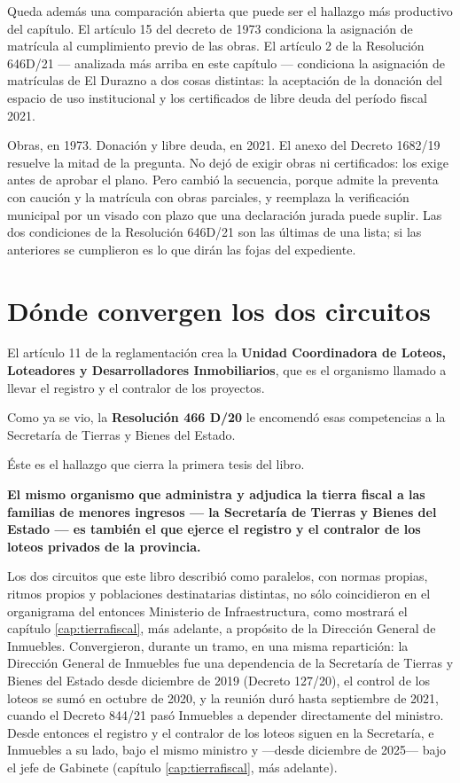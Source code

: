 Queda además una comparación abierta que puede ser el hallazgo más productivo del capítulo. El artículo 15 del decreto de 1973 condiciona la asignación de matrícula al cumplimiento previo de las obras. El artículo 2 de la Resolución 646D/21 --- analizada más arriba en este capítulo --- condiciona la asignación de matrículas de El Durazno a dos cosas distintas: la aceptación de la donación del espacio de uso institucional y los certificados de libre deuda del período fiscal 2021.

Obras, en 1973. Donación y libre deuda, en 2021. El anexo del Decreto 1682/19 resuelve la mitad de la pregunta. No dejó de exigir obras ni certificados: los exige antes de aprobar el plano. Pero cambió la secuencia, porque admite la preventa con caución y la matrícula con obras parciales, y reemplaza la verificación municipal por un visado con plazo que una declaración jurada puede suplir. Las dos condiciones de la Resolución 646D/21 son las últimas de una lista; si las anteriores se cumplieron es lo que dirán las fojas del expediente.

\section{Dónde convergen los dos circuitos}

El artículo 11 de la reglamentación crea la \textbf{Unidad Coordinadora de Loteos, Loteadores y Desarrolladores Inmobiliarios}, que es el organismo llamado a llevar el registro y el contralor de los proyectos.

Como ya se vio, la \textbf{Resolución 466 D/20} le encomendó esas competencias a la Secretaría de Tierras y Bienes del Estado.

Éste es el hallazgo que cierra la primera tesis del libro.

\textbf{El mismo organismo que administra y adjudica la tierra fiscal a las familias de menores ingresos --- la Secretaría de Tierras y Bienes del Estado --- es también el que ejerce el registro y el contralor de los loteos privados de la provincia.}

Los dos circuitos que este libro describió como paralelos, con normas propias, ritmos propios y poblaciones destinatarias distintas, no sólo coincidieron en el organigrama del entonces Ministerio de Infraestructura, como mostrará el capítulo \ref{cap:tierrafiscal}, más adelante, a propósito de la Dirección General de Inmuebles. Convergieron, durante un tramo, en una misma repartición: la Dirección General de Inmuebles fue una dependencia de la Secretaría de Tierras y Bienes del Estado desde diciembre de 2019 (Decreto 127/20), el control de los loteos se sumó en octubre de 2020, y la reunión duró hasta septiembre de 2021, cuando el Decreto 844/21 pasó Inmuebles a depender directamente del ministro. Desde entonces el registro y el contralor de los loteos siguen en la Secretaría, e Inmuebles a su lado, bajo el mismo ministro y ---desde diciembre de 2025--- bajo el jefe de Gabinete (capítulo \ref{cap:tierrafiscal}, más adelante).


